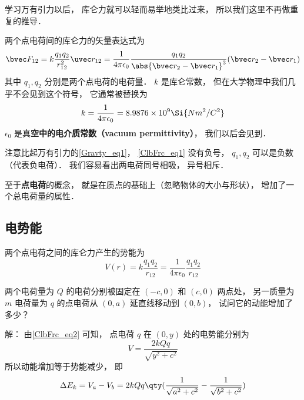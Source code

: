 

学习万有引力以后， 库仑力就可以轻而易举地类比过来， 所以我们这里不再做重复的推导．

两个点电荷间的库仑力的矢量表达式为
\begin{equation}\label{ClbFrc_eq1}
\bvec F_{12} = k\frac{q_1 q_2}{r_{12}^2} \uvec r_{12} = \frac{1}{4\pi\epsilon_0} \frac{q_1 q_2}{\abs{\bvec r_2 - \bvec r_1}^3}(\bvec r_2 - \bvec r_1)
\end{equation}
其中 $q_1, q_2$ 分别是两个点电荷的电荷量． $k$ 是库仑常数， 但在大学物理中我们几乎不会见到这个符号， 它通常被替换为
\begin{equation}
k = \frac{1}{4\pi\epsilon_0} = 8.9876\times 10^9 \Si{N m^2/C^2}
\end{equation}
$\epsilon_0$ 是真\textbf{空中的电介质常数（vacuum permittivity）}， 我们以后会见到．

注意比起万有引力的\autoref{Gravty_eq1}， \autoref{ClbFrc_eq1} 没有负号， $q_1, q_2$ 可以是负数（代表负电荷）． 我们容易看出两电荷同号相吸， 异号相斥．

至于\textbf{点电荷}的概念， 就是在质点的基础上（忽略物体的大小与形状）， 增加了一个总电荷量的属性．

\subsection{电势能}
两个点电荷之间的库仑力产生的势能为
\begin{equation}\label{ClbFrc_eq2}
V(r) = k \frac{q_1 q_2}{r_{12}} = \frac{1}{4\pi\epsilon_0} \frac{q_1 q_2}{r_{12}}
\end{equation}

\begin{example}{}
两个电荷量为 $Q$ 的电荷分别被固定在 $(-c, 0)$ 和 $(c, 0)$ 两点处， 另一质量为 $m$ 电荷量为 $q$ 的点电荷从 $(0, a)$ 延直线移动到 $(0, b)$， 试问它的动能增加了多少？

解： 由\autoref{ClbFrc_eq2} 可知， 点电荷 $q$ 在 $(0, y)$ 处的电势能分别为
\begin{equation}
V = \frac{2kQq}{\sqrt{y^2 + c^2}}
\end{equation}
所以动能增加等于势能减少， 即
\begin{equation}
\Delta E_k = V_a - V_b = 2kQq \qty(\frac{1}{\sqrt{a^2 + c^2}} - \frac{1}{\sqrt{b^2 + c^2}})
\end{equation}
\end{example}
